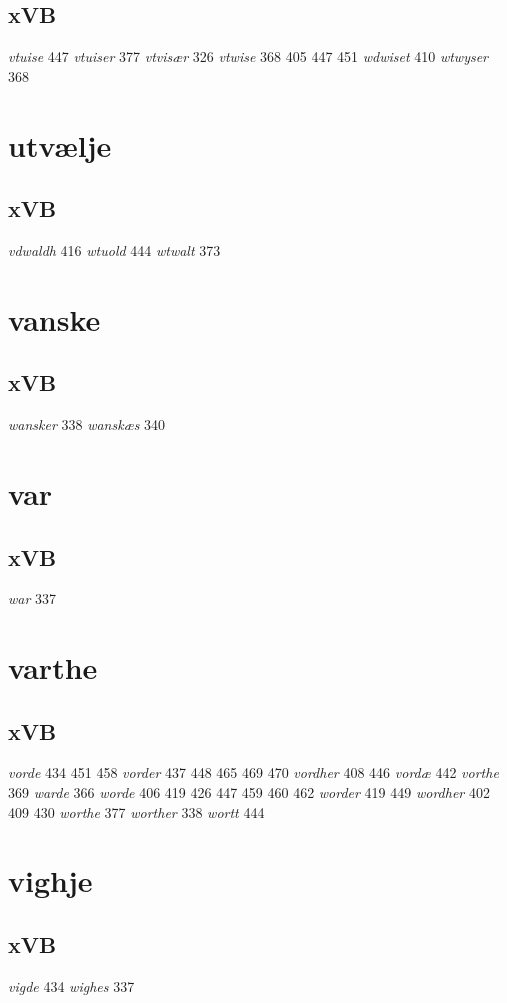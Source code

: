 \documentclass[a4paper,twocolumn]{article}
\begin{document}
\subsection{xVB}
\label{sec:org995456b}
\emph{vtuise} 447 \emph{vtuiser} 377 \emph{vtvisær} 326 \emph{vtwise} 368 405 447 451 \emph{wdwiset} 410 \emph{wtwyser} 368 
\section{utvælje}
\label{sec:org1d54358}
\subsection{xVB}
\label{sec:orgc377349}
\emph{vdwaldh} 416 \emph{wtuold} 444 \emph{wtwalt} 373 
\section{vanske}
\label{sec:org1b37b26}
\subsection{xVB}
\label{sec:org7015025}
\emph{wansker} 338 \emph{wanskæs} 340 
\section{var}
\label{sec:org14afe93}
\subsection{xVB}
\label{sec:org2727535}
\emph{war} 337 
\section{varthe}
\label{sec:orgfd31725}
\subsection{xVB}
\label{sec:org3f883e8}
\emph{vorde} 434 451 458 \emph{vorder} 437 448 465 469 470 \emph{vordher} 408 446 \emph{vordæ} 442 \emph{vorthe} 369 \emph{warde} 366 \emph{worde} 406 419 426 447 459 460 462 \emph{worder} 419 449 \emph{wordher} 402 409 430 \emph{worthe} 377 \emph{worther} 338 \emph{wortt} 444 
\section{vighje}
\label{sec:org9a56030}
\subsection{xVB}
\label{sec:org06fd781}
\emph{vigde} 434 \emph{wighes} 337 
\end{document}

